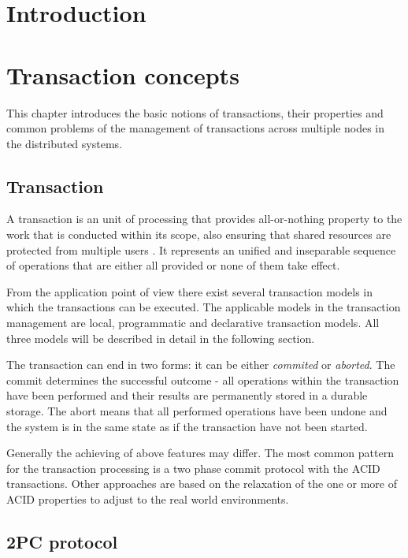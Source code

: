 \documentclass[oneside,
  digital, %
  table,   %
  nolof,     %
  nolot,     %
]{fithesis3}
\begin{document}
\chapter{Introduction}

\chapter{Transaction concepts}

This chapter introduces the basic notions of transactions, their properties and common problems of the management of transactions across multiple nodes in the distributed systems. 

\section{Transaction}

A transaction is an unit of processing that provides all-or-nothing property to the work that is conducted within its scope, also ensuring that shared resources are protected from multiple users \cite{java_tran_processing}. It represents an unified and inseparable sequence of operations that are either all provided or none of them take effect. 

From the application point of view there exist several transaction models in which the transactions can be executed. The applicable models in the transaction management are local, programmatic and declarative transaction models. All three models will be described in detail in the following section.

The transaction can end in two forms: it can be either \textit{commited} or \textit{aborted}. The commit determines the successful outcome - all operations within the transaction have been performed and their results are permanently stored in a durable storage. The abort means that all performed operations have been undone and the system is in the same state as if the transaction have not been started.

Generally the achieving of above features may differ. The most common pattern for the transaction processing is a two phase commit protocol with the ACID transactions. Other approaches are based on the relaxation of the one or more of ACID properties to adjust to the real world environments.

\section{2PC protocol}
\end{document}
